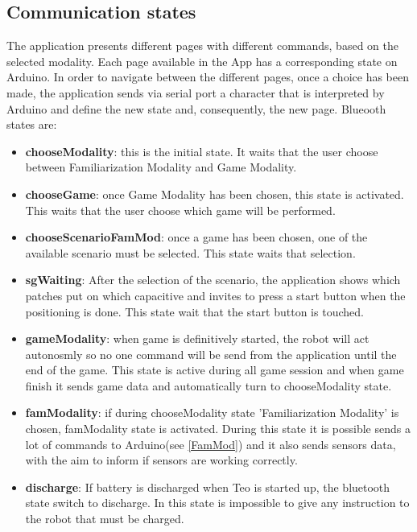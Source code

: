 \subsection{Communication states}
The application presents different pages with different commands, based on the selected modality. Each page available in the App has a corresponding state on Arduino. In order to navigate between the different pages, once a choice has been made, the application sends via serial port a character that is interpreted by Arduino and define the new state and, consequently, the new page. 
Blueooth states are:
\begin{itemize}
	\item \textbf{chooseModality}: this is the initial state. It waits that the user choose between Familiarization Modality and Game Modality.
	\item \textbf{chooseGame}: once Game Modality has been chosen, this state is activated. This waits that the user choose which game will be performed.
	\item \textbf{chooseScenarioFamMod}: once a game has been chosen, one of the available scenario must be selected. This state waits that selection.
	\item \textbf{sgWaiting}: After the selection of the scenario, the application shows which patches put on which capacitive and invites to press a start button when the positioning is done. This state wait that the start button is touched.
	\item \textbf{gameModality}: when game is definitively started, the robot will act autonosmly so no one command will be send from the application until the end of the game. This state is active during all game session and when game finish it sends game data and  automatically turn to chooseModality state.
	\item \textbf{famModality}: if during chooseModality state 'Familiarization Modality' is chosen, famModality state is activated. During this state it is possible sends a lot of commands to Arduino(see \ref{FamMod}) and it also sends sensors data, with the aim to inform if sensors are working correctly.
	\item \textbf{discharge}: If battery is discharged when Teo is started up, the bluetooth state switch to discharge. In this state is impossible to give any instruction to the robot that must be charged.
\end{itemize}



